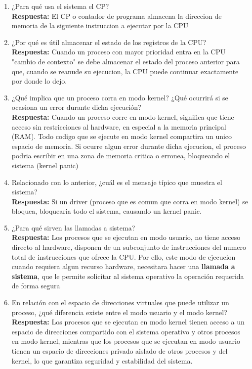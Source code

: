\documentclass[a4paper,12pt]{article}
\begin{document}
\begin{enumerate}[label=\textbf{Pregunta \arabic*.}]
    \item ¿Para qué usa el sistema el CP? \\
    \textbf{Respuesta:} 
    El CP o contador de programa almacena la direccion de memoria de la siguiente instruccion a ejecutar por la CPU

    \item ¿Por qué es útil almacenar el estado de los registros de la CPU? \\
    \textbf{Respuesta:} 
    Cuando un proceso con mayor prioridad entra en la CPU "cambio de contexto" se debe almacenar el estado del proceso anterior para que, cuando se reanude su ejecucion, la CPU puede continuar exactamente por donde lo dejo.

    \item ¿Qué implica que un proceso corra en modo kernel? ¿Qué ocurrirá si se ocasiona un error durante dicha ejecución? \\
    \textbf{Respuesta:} 
    Cuando un proceso corre en modo kernel, significa que tiene acceso sin restricciones al hardware, en especial a la memoria principal (RAM). Todo codigo que se ejecute en modo kernel compartira un unico espacio de memoria. Si ocurre algun error durante dicha ejecucion, el proceso podria escribir en una zona de memoria critica o erronea, bloqueando el sistema (kernel panic)

    \item Relacionado con lo anterior, ¿cuál es el mensaje típico que muestra el sistema? \\
    \textbf{Respuesta:} 
    Si un driver (proceso que es comun que corra en modo kernel) se bloquea, bloquearia todo el sistema, causando un kernel panic.

    \item ¿Para qué sirven las llamadas a sistema? \\
    \textbf{Respuesta:} 
    Los procesos que se ejecutan en modo usuario, no tiene acceso directo al hardware, disponen de un subconjunto de instrucciones del numero total de instrucciones que ofrece la CPU. Por ello, este modo de ejecucion cuando requiera algun recurso hardware, necesitara hacer una \textbf{llamada a sistema}, que le permite solicitar al sistema operativo la operación requerida de forma segura

    \item En relación con el espacio de direcciones virtuales que puede utilizar un proceso, ¿qué diferencia existe entre el modo usuario y el modo kernel? \\
    \textbf{Respuesta:} 
    Los procesos que se ejecutan en modo kernel tienen acceso a un espacio de direcciones compartido con el sistema operativo y otros procesos en modo kernel, mientras que los procesos que se ejecutan en modo usuario tienen un espacio de direcciones privado aislado de otros procesos y del kernel, lo que garantiza seguridad y estabilidad del sistema.


\end{enumerate}
\end{document}

